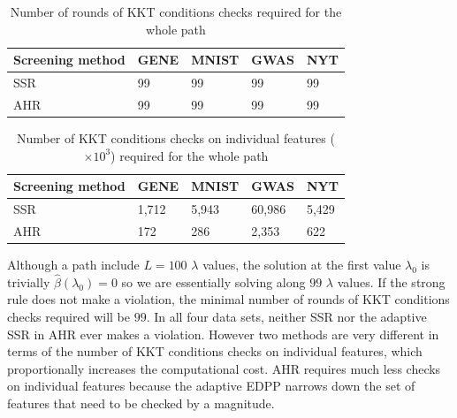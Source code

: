 \documentclass[]{interact}
\theoremstyle{plain}%
\theoremstyle{definition}
\theoremstyle{remark}
\providecommand{\lam}{\lambda}
\begin{document}
\begin{table}[H]
\centering
\begin{tabular}{lllll}
\toprule
Screening method & GENE & MNIST & GWAS & NYT \\
\midrule
SSR & 99 & 99 & 99 & 99 \\
AHR & 99 & 99 & 99 & 99 \\
\bottomrule
\end{tabular}
\caption{Number of rounds of KKT conditions checks required for the whole path}
\label{Tab:kkt1}
\end{table}

\begin{table}[H]
\centering
\begin{tabular}{lllll}
\toprule
Screening method & GENE & MNIST & GWAS & NYT \\
\midrule
SSR & 1,712 & 5,943 & 60,986 & 5,429 \\
AHR & 172 & 286 & 2,353 & 622 \\
\bottomrule
\end{tabular}
\caption{Number of KKT conditions checks on individual features ($\times10^3$) required for the whole path}
\label{Tab:kkt2}
\end{table}

Although a path include $L=100$ $\lambda$ values, the solution at the first value $\lambda_{0}$ is trivially $\hat{\beta}(\lambda_0)=0$ so we are essentially solving along $99$ $\lam$ values. If the strong rule does not make a violation, the minimal number of rounds of KKT conditions checks required will be $99$. In all four data sets, neither SSR nor the adaptive SSR in AHR ever makes a violation. However two methods are very different in terms of the number of KKT conditions checks on individual features, which proportionally increases the computational cost. AHR requires much less checks on individual features because the adaptive EDPP narrows down the set of features that need to be checked by a magnitude.
\end{document}
